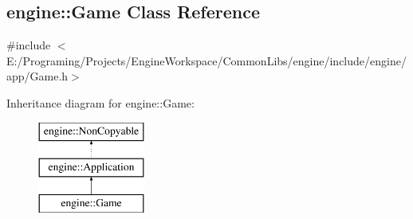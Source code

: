 \hypertarget{a00038}{}\subsection{engine\+:\+:Game Class Reference}
\label{a00038}


{\ttfamily \#include $<$E\+:/\+Programing/\+Projects/\+Engine\+Workspace/\+Common\+Libs/engine/include/engine/app/\+Game.\+h$>$}

Inheritance diagram for engine\+:\+:Game\+:\begin{figure}[H]
\begin{center}
\leavevmode
\includegraphics[height=3.000000cm]{a00038}
\end{center}
\end{figure}
